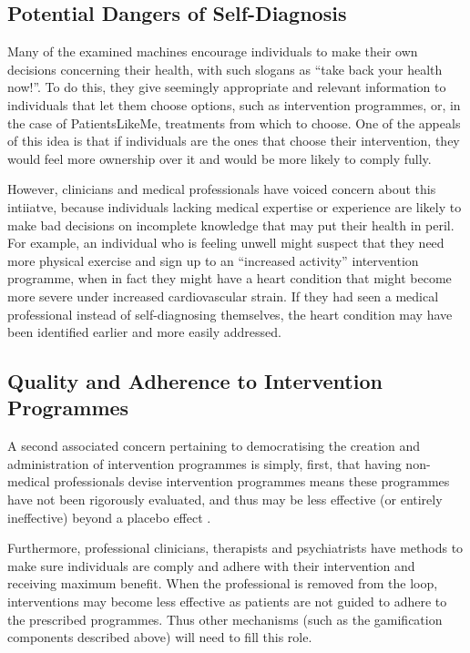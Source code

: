 \documentclass{sig-alternate}
\begin{document}
\subsection{Potential Dangers of Self-Diagnosis}

Many of the examined machines encourage individuals to make their own
decisions concerning their health, with such slogans as ``take back
your health now!''.  To do this, they give seemingly appropriate and
relevant information to individuals that let them choose options, such
as intervention programmes, or, in the case of PatientsLikeMe,
treatments from which to choose.  One of the appeals of this idea is
that if individuals are the ones that choose their intervention, they
would feel more ownership over it and would be more likely to comply
fully.

However, clinicians and medical professionals have voiced concern
about this intiiatve, because individuals lacking medical expertise or
experience are likely to make bad decisions on incomplete knowledge
that may put their health in peril.  For example, an individual who is
feeling unwell might suspect that they need more physical exercise and
sign up to an ``increased activity'' intervention programme, when in
fact they might have a heart condition that might become more severe
under increased cardiovascular strain.  If they had seen a medical
professional instead of self-diagnosing themselves, the heart
condition may have been identified earlier and more easily addressed.

\subsection{Quality and Adherence to Intervention Programmes}

A second associated concern pertaining to democratising the creation
and administration of intervention programmes is simply, first, that
having non-medical professionals devise intervention programmes means
these programmes have not been rigorously evaluated, and thus may be
less effective (or entirely ineffective) beyond a placebo effect
\cite{placeboeffect}.  

Furthermore, professional clinicians, therapists and psychiatrists
have methods to make sure individuals are comply and adhere with their
intervention and receiving maximum benefit.  When the professional is
removed from the loop, interventions may become less effective as
patients are not guided to adhere to the prescribed programmes. Thus
other mechanisms (such as the gamification components described above)
will need to fill this role.
\end{document}
